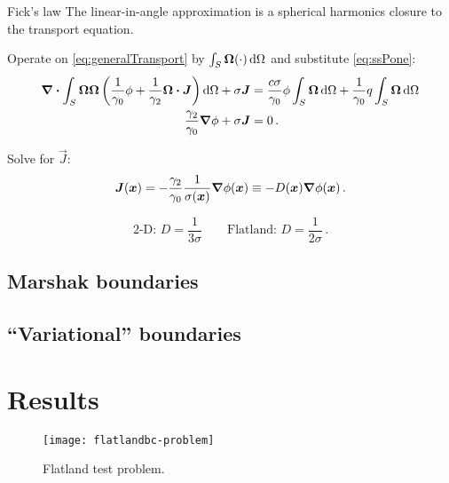 \documentclass{beamer}
\begin{document}
\begin{frame}{Fick's law}
The linear-in-angle approximation is a spherical harmonics closure to the
transport equation.

Operate on \eqref{eq:generalTransport} by $\int_S \bm{\Omega} (\cdot)
\mathop{}\!\mathrm{d}\Omega$ and substitute \eqref{eq:ssPone}:
\begin{align*}
  \bm{\nabla} \bm{\cdot} \int_S \bm{\Omega} \bm{\Omega} \left(
  \frac{1}{\gamma_0}\phi + \frac{1}{\gamma_2} \bm{\Omega} \bm{\cdot} \bm{J}
  \right)
  \mathop{}\!\mathrm{d}\Omega
  + \sigma \bm{J}
  &=
  \frac{c\sigma}{\gamma_0} \phi \int_S \bm{\Omega} \mathop{}\!\mathrm{d}\Omega
  + \frac{1}{\gamma_0} q \int_S \bm{\Omega} \mathop{}\!\mathrm{d}\Omega
  \\
  \frac{\gamma_2}{\gamma_0} \bm{\nabla} \phi + \sigma \bm{J} &= 0 \,.
\end{align*}

Solve for $\vec{J}$:
\begin{equation} \label{eq:fickGeneral}
  \bm{J}(\bm{x})
  = - \frac{\gamma_2}{\gamma_0} \frac{1}{\sigma(\bm{x})} \bm{\nabla} \phi(\bm{x})
  \equiv -D(\bm{x}) \bm{\nabla} \phi(\bm{x})\,.
\end{equation}

\begin{equation*}
  \text{2-D: } D = \frac{1}{3\sigma} \qquad
  \text{Flatland: } D = \frac{1}{2\sigma}\,.
\end{equation*}
\end{frame}

\subsection{Marshak boundaries}

\subsection{``Variational'' boundaries}

\section{Results}
\begin{frame}
\begin{figure}[tb]
  \centering
  \texttt{[image: flatlandbc-problem]}
  \caption{Flatland test problem.}
  \label{fig:problem}
\end{figure}
\end{frame}
\end{document}
